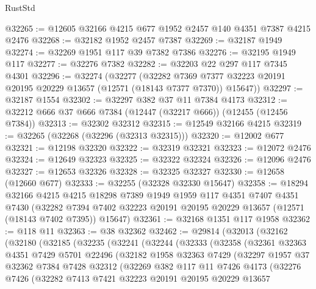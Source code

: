\begin{lexlean}{RustStd}
\begin{coremodule}
@32265 := @12605 @32166 @4215 @677 @1952 @2457 @140 @4351 @7387 @4215 @2476
@32268 := @32182 @1952 @2457 @7387
@32269 := @32187 @1949
@32274 := @32269 @1951 @117 @39 @7382 @7386
@32276 := @32195 @1949 @117
@32277 := @32276 @7382
@32282 := @32203 @22 @297 @117 @7345 @4301
@32296 := @32274
    (@32277
      (@32282 @7369 @7377 @32223 @20191 @20195 @20229 @13657 (@12571 (@18143 @7377 @7370)) @15647))
@32297 := @32187 @1554
@32302 := @32297 @382 @37 @11 @7384 @4173
@32312 := @32212 @666 @37 @666 @7384 (@12447 (@32217 @666)) (@12455 (@12456 @7384))
@32313 := @32302 @32312
@32315 := @12549 @32166 @4215
@32319 := @32265 (@32268 (@32296 (@32313 @32315)))
@32320 := @12002 @677
@32321 := @12198 @32320
@32322 := @32319 @32321
@32323 := @12072 @2476
@32324 := @12649 @32323
@32325 := @32322 @32324
@32326 := @12096 @2476
@32327 := @12653 @32326
@32328 := @32325 @32327
@32330 := @12658 (@12660 @677)
@32333 := @32255 (@32328 @32330 @15647)
@32358 := @18294
    @32166
    @4215
    @4215
    @18298
    @7389
    @1949
    @1959
    @117
    @4351
    @7407
    @4351
    @7430
    (@32282 @7394 @7402 @32223 @20191 @20195 @20229 @13657 (@12571 (@18143 @7402 @7395)) @15647)
@32361 := @32168 @1351 @117 @1958
@32362 := @118 @11
@32363 := @38 @32362
@32462 := @29814
    (@32013
      (@32162
        (@32180
          (@32185
            (@32235
              (@32241
                (@32244
                  (@32333
                    (@32358
                      (@32361
                        @32363
                        @4351
                        @7429
                        @5701
                        @22496
                        (@32182
                          @1958
                          @32363
                          @7429
                          (@32297
                            @1957
                            @37
                            @32362
                            @7384
                            @7428
                            @32312
                            (@32269
                              @382
                              @117
                              @11
                              @7426
                              @4173
                              (@32276
                                @7426
                                (@32282
                                  @7413
                                  @7421
                                  @32223
                                  @20191
                                  @20195
                                  @20229
                                  @13657

\end{coremodule}
\end{lexlean}
